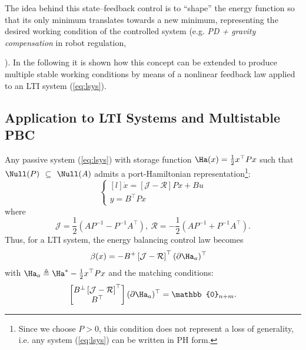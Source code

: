 The idea behind this state--feedback control is to ``shape'' the energy function so that its only minimum translates towards a new minimum, representing the desired working condition of the controlled system (e.g. \textit{PD + gravity compensation} in robot regulation, {\cite{secchi2007control}). In the following it is shown how this concept can be extended to produce multiple stable working conditions by means of a nonlinear feedback law applied to an LTI system (\ref{eq:lsys}).
%
\subsection{Application to LTI Systems and Multistable PBC}
%
Any passive system (\ref{eq:lsys}) with storage function $\Ha(x) = \frac{1}{2}x^\top Px$ such that $\Null(P)$ $\subseteq$ $\Null(A)$ admits a port-Hamiltonian representation\footnote{Since we choose $P>0$, this condition does not represent a loss of generality, i.e. any system (\ref{eq:lsys}) can be written in PH form.}:
%
\begin{equation*}
    \left\{
    \begin{matrix*}[l]
    \dot{x} = \left[\mathcal{J}-\mathcal{R}\right]Px + Bu\\
    y = B^\top Px
    \end{matrix*}
    \right.
\end{equation*}
%
where 
\[\mathcal{J} = \frac{1}{2}(AP^{-1}-P^{-1}A^\top),~\mathcal{R} =- \frac{1}{2}(AP^{-1}+P^{-1}A^\top).\]
Thus, for a LTI system, the energy balancing control law becomes 
\begin{align}\label{eq:multiebpbc_lin}
    \beta(x) &= -B^+\left[\mathcal{J}-\mathcal{R}\right]^\top(\partial\Ha_a)^\top
\end{align}
with $\Ha_a\triangleq\Ha^*-\frac{1}{2}x^\top Px$ and the matching conditions:
\begin{equation}\label{eq:match_lin}
    \begin{bmatrix}{B}^{\perp}\left[\mathcal{J}-\mathcal{R}\right]^\top\\{B}^\top\end{bmatrix}(\partial\Ha_a)^\top = \mathbb{0}_{n+m}.
\end{equation}
%
}

